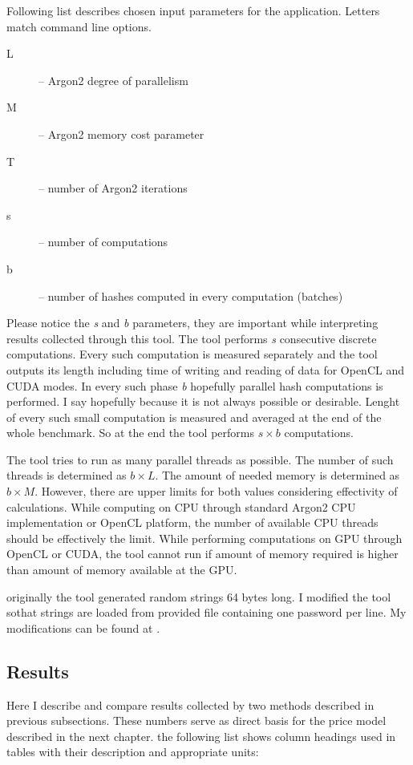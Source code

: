 \documentclass[nolof]{fithesis3}
\begin{document}
Following list describes chosen input parameters for the application. Letters match command line options.

\begin{description}
\item[L] -- Argon2 degree of parallelism

\item[M] -- Argon2 memory cost parameter

\item[T] -- number of Argon2 iterations

\item[s] -- number of computations

\item[b] -- number of hashes computed in every computation (batches)
\end{description}

Please notice the \emph{s} and \emph{b} parameters, they are important while interpreting results collected through this tool. The tool performs \emph{s} consecutive discrete computations. Every such computation is measured separately and the tool outputs its length including time of writing and reading of data for OpenCL and CUDA modes. In every such phase \emph{b} hopefully parallel hash computations is performed. I say hopefully because it is not always possible or desirable. Lenght of every such small computation is measured and averaged at the end of the whole benchmark.  So at the end the tool performs $s \times b$ computations.

The tool tries to run as many parallel threads as possible. The number of such threads is determined as $b \times L$. The amount of needed memory is determined as $b \times M$. However, there are upper limits for both values considering effectivity of calculations. While computing on CPU through standard Argon2 CPU implementation or OpenCL platform, the number of available CPU threads should be effectively the limit. While performing computations on GPU through OpenCL or CUDA, the tool cannot run if amount of memory required is higher than amount of memory available at the GPU.

originally the tool generated random strings 64 bytes long. I modified the tool sothat strings are loaded from provided file containing one password per line. My modifications can be found at \parencite{argon2gpuvojta}.

\FloatBarrier

\subsection{Results}
Here I describe and compare results collected by two methods described in previous subsections. These numbers serve as direct basis for the price model described in the next chapter. the following list shows column headings used in tables with their description and appropriate units:
\end{document}
